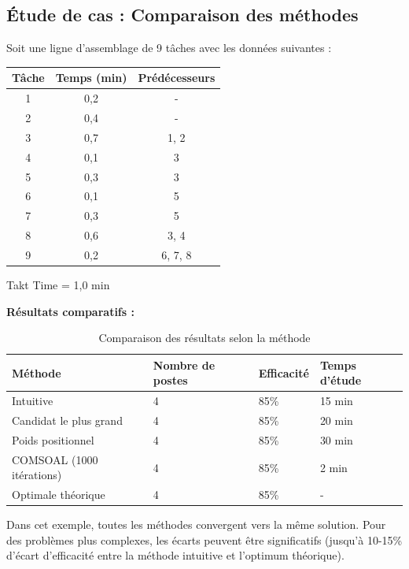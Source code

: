 \documentclass[12pt,a4paper]{article}
\newenvironment{importantnote}
  {\begin{tcolorbox}[colback=blue!5!white, colframe=blue!50!black, title=\textbf{Point Important}]\small}
  {\end{tcolorbox}}
\begin{document}
\subsection{Étude de cas : Comparaison des méthodes}

Soit une ligne d'assemblage de 9 tâches avec les données suivantes :

\begin{table}[H]
\centering
\begin{tabular}{|c|c|c|}
\hline
\textbf{Tâche} & \textbf{Temps (min)} & \textbf{Prédécesseurs} \\
\hline
1 & 0,2 & - \\
\hline
2 & 0,4 & - \\
\hline
3 & 0,7 & 1, 2 \\
\hline
4 & 0,1 & 3 \\
\hline
5 & 0,3 & 3 \\
\hline
6 & 0,1 & 5 \\
\hline
7 & 0,3 & 5 \\
\hline
8 & 0,6 & 3, 4 \\
\hline
9 & 0,2 & 6, 7, 8 \\
\hline
\end{tabular}
\end{table}

Takt Time = 1,0 min

\textbf{Résultats comparatifs :}

\begin{table}[H]
\centering
\begin{tabular}{|p{4cm}|p{2.5cm}|p{2.5cm}|p{2.5cm}|}
\hline
\textbf{Méthode} & \textbf{Nombre de postes} & \textbf{Efficacité} & \textbf{Temps d'étude} \\
\hline
Intuitive & 4 & 85\% & 15 min \\
\hline
Candidat le plus grand & 4 & 85\% & 20 min \\
\hline
Poids positionnel & 4 & 85\% & 30 min \\
\hline
COMSOAL (1000 itérations) & 4 & 85\% & 2 min \\
\hline
Optimale théorique & 4 & 85\% & - \\
\hline
\end{tabular}
\caption{Comparaison des résultats selon la méthode}
\end{table}

\begin{importantnote}
Dans cet exemple, toutes les méthodes convergent vers la même solution. Pour des problèmes plus complexes, les écarts peuvent être significatifs (jusqu'à 10-15\% d'écart d'efficacité entre la méthode intuitive et l'optimum théorique).
\end{importantnote}
\newpage
\end{document}
